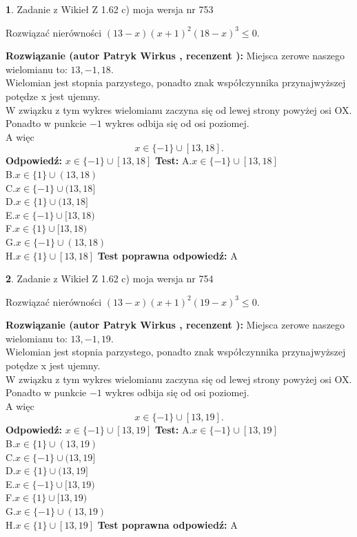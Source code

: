 \documentclass[12pt, a4paper]{article}
\theoremstyle{definition} %
\newtheorem{zad}{}
\newcommand{\zadStart}[1]{\begin{zad}#1\newline}
\newcommand{\zadStop}{\end{zad}}
\newcommand{\rozwStart}[2]{\noindent \textbf{Rozwiązanie (autor #1 , recenzent #2): }\newline}
\newcommand{\rozwStop}{\newline}
\newcommand{\odpStart}{\noindent \textbf{Odpowiedź:}\newline}
\newcommand{\odpStop}{\newline}
\newcommand{\testStart}{\noindent \textbf{Test:}\newline}
\newcommand{\testStop}{\newline}
\newcommand{\kluczStart}{\noindent \textbf{Test poprawna odpowiedź:}\newline}
\newcommand{\kluczStop}{\newline}
\begin{document}
\zadStart{Zadanie z Wikieł Z 1.62 c) moja wersja nr 753}

Rozwiązać nierówności $(13-x)(x+1)^{2}(18-x)^{3}\le0$.
\zadStop
\rozwStart{Patryk Wirkus}{}
Miejsca zerowe naszego wielomianu to: $13, -1, 18$.\\
Wielomian jest stopnia parzystego, ponadto znak współczynnika przy\linebreak najwyższej potędze x jest ujemny.\\ W związku z tym wykres wielomianu zaczyna się od lewej strony powyżej osi OX.\\
Ponadto w punkcie $-1$ wykres odbija się od osi poziomej.\\
A więc $$x \in \{-1\} \cup [13,18].$$
\rozwStop
\odpStart
$x \in \{-1\} \cup [13,18]$
\odpStop
\testStart
A.$x \in \{-1\} \cup [13,18]$\\
B.$x \in \{1\} \cup (13,18)$\\
C.$x \in \{-1\} \cup (13,18]$\\
D.$x \in \{1\} \cup (13,18]$\\
E.$x \in \{-1\} \cup [13,18)$\\
F.$x \in \{1\} \cup [13,18)$\\
G.$x \in \{-1\} \cup (13,18)$\\
H.$x \in \{1\} \cup [13,18]$
\testStop
\kluczStart
A
\kluczStop



\zadStart{Zadanie z Wikieł Z 1.62 c) moja wersja nr 754}

Rozwiązać nierówności $(13-x)(x+1)^{2}(19-x)^{3}\le0$.
\zadStop
\rozwStart{Patryk Wirkus}{}
Miejsca zerowe naszego wielomianu to: $13, -1, 19$.\\
Wielomian jest stopnia parzystego, ponadto znak współczynnika przy\linebreak najwyższej potędze x jest ujemny.\\ W związku z tym wykres wielomianu zaczyna się od lewej strony powyżej osi OX.\\
Ponadto w punkcie $-1$ wykres odbija się od osi poziomej.\\
A więc $$x \in \{-1\} \cup [13,19].$$
\rozwStop
\odpStart
$x \in \{-1\} \cup [13,19]$
\odpStop
\testStart
A.$x \in \{-1\} \cup [13,19]$\\
B.$x \in \{1\} \cup (13,19)$\\
C.$x \in \{-1\} \cup (13,19]$\\
D.$x \in \{1\} \cup (13,19]$\\
E.$x \in \{-1\} \cup [13,19)$\\
F.$x \in \{1\} \cup [13,19)$\\
G.$x \in \{-1\} \cup (13,19)$\\
H.$x \in \{1\} \cup [13,19]$
\testStop
\kluczStart
A
\kluczStop
\end{document}
